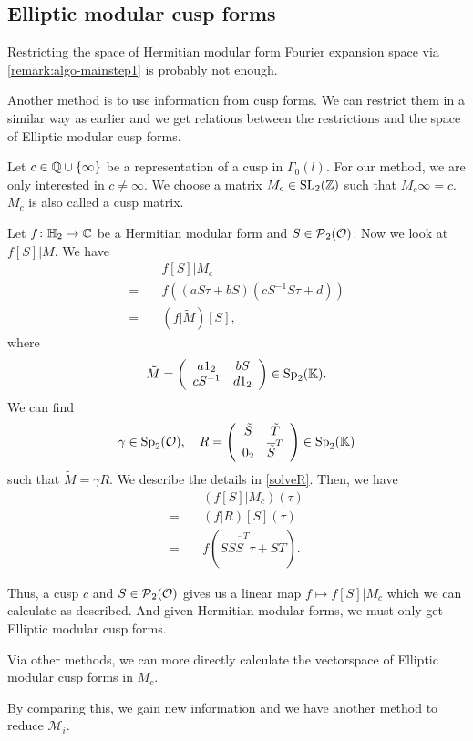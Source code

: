 \subsection{Elliptic modular cusp forms}
\label{cuspInfo}

Restricting the space of Hermitian modular form Fourier expansion space via \cref{remark:algo-mainstep1} is probably not enough. %

Another method is to use information from cusp forms. We can restrict them in a similar way as earlier and we get relations between the restrictions and the space of Elliptic modular cusp forms.

Let $c \in \Q \cup \Set{\infty}$ be a representation of a cusp in $\Gamma_0(l)$. For our method, we are only interested in $c \ne \infty$. We choose a matrix $M_c \in \operatorname{SL}_2(\mathbb{Z})$ such that $M_c \infty = c$. $M_c$ is also called a cusp matrix.

Let $f \colon \mathbb{H}_2 \rightarrow \mathbb{C}$ be a Hermitian modular form and $S \in \operatorname{\mathcal{P}}_2(\mathcal{O})$. Now we look at $f[S] | M$. We have
\begin{align*}
& f[S] | M_c \\
=\quad & f( (a S \tau + b S) ( c S^{-1} S \tau + d) ) \\
=\quad & ( f | \tilde{M} )[S] ,
\end{align*}
where
\[ \tilde{M} = \left( \begin{array}{cc} a1_2 & bS \\ cS^{-1} & d1_2 \end{array} \right) \in \operatorname{Sp}_2(\mathbb{K}) . \]
%
We can find
\[ \gamma \in \operatorname{Sp}_2(\mathcal{O}), \quad R = \left( \begin{array}{cc} \tilde{S} & \tilde{T} \\ 0_2 & \overline{\tilde{S}}^T \end{array} \right) \in \operatorname{Sp}_2(\mathbb{K}) \]
such that $\tilde{M} = \gamma R$. We describe the details in \cref{solveR}.
Then, we have
\begin{align*}
& (f[S] | M_c) (\tau) \\
=\quad& (f | R) [S] (\tau) \\
=\quad& f( \tilde{S} S \overline{\tilde{S}}^T \tau + \tilde{S} \tilde{T} ) .
\end{align*}

Thus, a cusp $c$ and $S \in \operatorname{\mathcal{P}}_2(\mathcal{O})$ gives us a linear map $f \mapsto f[S] | M_c$ which we can calculate as described. %
And given Hermitian modular forms, we must only get Elliptic modular cusp forms.

Via other methods, we can more directly calculate the vectorspace of Elliptic modular cusp forms in $M_c$.

By comparing this, we gain new information and we have another method to reduce $\mathcal{M}_i$.

